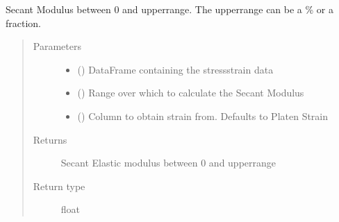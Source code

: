 \documentclass[letterpaper,10pt,english]{sphinxmanual}
\begin{document}
\begin{fulllineitems}
\begin{fulllineitems}
\begin{quote}
\begin{description}
\end{description}\end{quote}

\end{fulllineitems}


\begin{fulllineitems}
\label{\detokenize{openfdem:openfdem.openfdem.Model.Esec_mod}}
Secant Modulus between 0 and upperrange. The upperrange can be a \% or a fraction.
\begin{quote}\begin{description}
\item[{Parameters}] \leavevmode\begin{itemize}
\item {} 
 () \textendash{} DataFrame containing the stress\sphinxhyphen{}strain data

\item {} 
 () \textendash{} Range over which to calculate the Secant Modulus

\item {} 
 () \textendash{} Column to obtain strain from. Defaults to Platen Strain

\end{itemize}

\item[{Returns}] \leavevmode
Secant Elastic modulus between 0 and upperrange

\item[{Return type}] \leavevmode
float


\end{description}
\end{quote}
\end{fulllineitems}
\end{fulllineitems}
\end{document}
